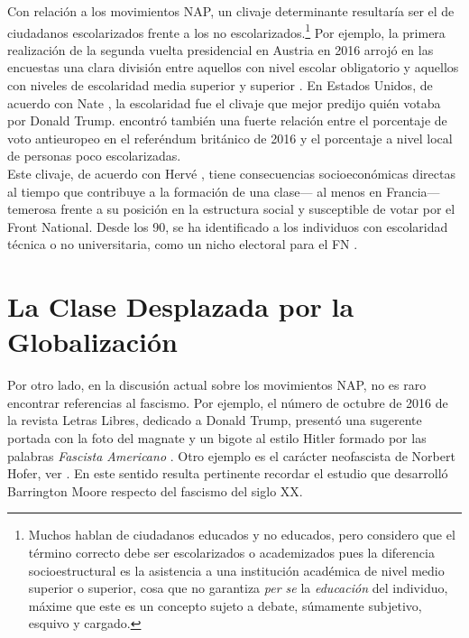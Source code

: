 Con relación a los movimientos NAP, un clivaje determinante resultaría ser el de ciudadanos escolarizados frente a los no escolarizados.\footnote{Muchos hablan de ciudadanos educados y no educados, pero considero que el término correcto debe ser escolarizados o academizados pues la diferencia socioestructural es la asistencia a una institución académica de nivel medio superior o superior, cosa que no garantiza \textit{per se} la \textit{educación} del individuo, máxime que este es un concepto sujeto a debate, súmamente subjetivo, esquivo y cargado.} Por ejemplo, la primera realización de la segunda vuelta presidencial en Austria en 2016 arrojó en las encuestas una clara división entre aquellos con nivel escolar obligatorio y aquellos con niveles de escolaridad media superior y superior \parencite{Hoare16}. En Estados Unidos, de acuerdo con Nate \textcite{Silver16}, la escolaridad fue el clivaje que mejor predijo quién votaba por Donald Trump. \textcite{Rae16} encontró también una fuerte relación entre el porcentaje de voto antieuropeo en el referéndum británico de 2016 y el porcentaje a nivel local de personas poco escolarizadas.\\ 

Este clivaje, de acuerdo con Hervé \textcite{LeBras15}, tiene consecuencias socioeconómicas directas al tiempo que contribuye a la formación de una clase--- al menos en Francia--- temerosa frente a su posición en la estructura social y susceptible de votar por el Front National. Desde los 90, se ha identificado a los individuos con escolaridad técnica o no universitaria, como un nicho electoral para el FN \parencites{MayerPerrineau90}{Perrineau99}{Gombin05}{Mayer05}{Mayer07}{Perrineau07}{Riviere12}{Perrineau12}. 

\section{La Clase Desplazada por la Globalización}

Por otro lado, en la discusión actual sobre los movimientos NAP, no es raro encontrar referencias al fascismo. Por ejemplo, el número de octubre de 2016 de la revista Letras Libres, dedicado a Donald Trump, presentó una sugerente portada con la foto del magnate y un bigote al estilo Hitler formado por las palabras \textit{Fascista Americano} \parencite{Fascista16}. Otro ejemplo es el carácter neofascista de Norbert Hofer, ver \textcite{Hoare16}. En este sentido resulta pertinente recordar el estudio que desarrolló Barrington Moore respecto del fascismo del siglo XX.\\ 

